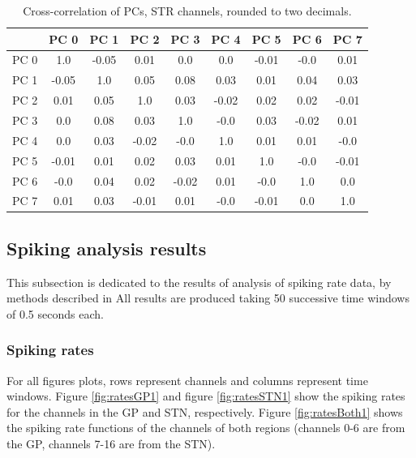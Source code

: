\documentclass{article}
\begin{document}
\begin{table}[H]
    \centering
    \begin{tabular}{|c|c|c|c|c|c|c|c|c|}
    \hline
          & PC 0  &  PC 1 &  PC 2 &  PC 3 &  PC 4 &  PC 5 &  PC 6 &  PC 7 \\ \hline
     PC 0 &  1.0  & -0.05 &  0.01 &  0.0  &  0.0  & -0.01 & -0.0  &  0.01 \\ \hline
     PC 1 & -0.05 &  1.0  &  0.05 &  0.08 &  0.03 &  0.01 &  0.04 &  0.03 \\ \hline
     PC 2 &  0.01 &  0.05 &  1.0  &  0.03 & -0.02 &  0.02 &  0.02 & -0.01 \\ \hline
     PC 3 &  0.0  &  0.08 &  0.03 &  1.0  & -0.0  &  0.03 & -0.02 &  0.01 \\ \hline
     PC 4 &  0.0  &  0.03 & -0.02 & -0.0  &  1.0  &  0.01 &  0.01 & -0.0  \\ \hline
     PC 5 & -0.01 &  0.01 &  0.02 &  0.03 &  0.01 &  1.0 &  -0.0  & -0.01 \\ \hline
     PC 6 & -0.0  &  0.04 &  0.02 & -0.02 &  0.01 & -0.0 &   1.0  &  0.0  \\ \hline
     PC 7 &  0.01 &  0.03 & -0.01 &  0.01 & -0.0  & -0.01 &  0.0  &  1.0  \\ \hline
    \end{tabular}
    \caption{Cross-correlation of PCs, STR channels, rounded to two decimals.}
    \label{tab:corrcoefSTR}
\end{table}

\subsection{Spiking analysis results}

This subsection is dedicated to the results of analysis of spiking rate data, by methods described in 
All results are produced taking 50 successive time windows of 0.5 seconds each.

\subsubsection{Spiking rates}

For all figures plots, rows represent channels and columns represent time windows. 
Figure \ref{fig:ratesGP1} and figure \ref{fig:ratesSTN1} show the spiking rates for the channels in the GP and STN, respectively.
Figure \ref{fig:ratesBoth1} shows the spiking rate functions of the channels of both regions (channels 0-6 are from the GP, channels 7-16 are from the STN).
\end{document}
